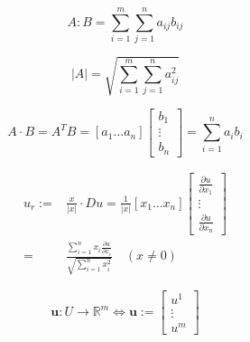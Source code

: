 \documentclass{blog}
\begin{document}
\begin{definition}[$A:B$]
    \begin{equation}
        \label{eq:A:B}
        A : B = \sum_{i=1}^{m}\sum_{j=1}^{n}a_{ij}b_{ij}
    \end{equation}
\end{definition}

\begin{definition}[$|A|$]
    \begin{equation}
        \label{eq:|A|}
        |A| = \sqrt{\sum_{i=1}^{m}\sum_{j=1}^{n} a_{ij}^{2}}
    \end{equation}
\end{definition}

\begin{definition}
    \begin{equation}
        A \cdot B = A^{T} B =
        [a_{1} \dots a_{n}]
        \begin{bmatrix}
            b_{1} \\ \vdots \\ b_{n}
        \end{bmatrix}
        = \sum_{i=1}^{n} a_{i}b_{i}
    \end{equation}
\end{definition}

\begin{definition}
    \begin{equation}
        \label{eq:radial-derivative}
        \begin{aligned}
            u_{r} := & \frac{x}{|x|} \cdot Du
            = \frac{1}{|x|} [x_{1} \dots x_{n}]
            \begin{bmatrix}
                \frac{\partial u}{\partial x_{1}} \\
                \vdots                            \\
                \frac{\partial u}{\partial x_{n}}
            \end{bmatrix}                                               \\
            =        & \frac{\sum_{i=1}^{n} x_{i}\frac{\partial u}{\partial x_{i}}}{\sqrt{\sum_{i=1}^{n} x_{i}^{2}}}
            \quad (x \neq 0)
        \end{aligned}
    \end{equation}
\end{definition}

\begin{definition}[$\boldsymbol{u}$]
    \begin{equation}
        \label{eq:us}
        \boldsymbol{u} : U \to \mathbb{R}^{m} \Leftrightarrow \boldsymbol{u} :=
        \begin{bmatrix}
            u^{1} \\ \vdots \\ u^{m}
        \end{bmatrix}
    \end{equation}
\end{definition}
\end{document}
